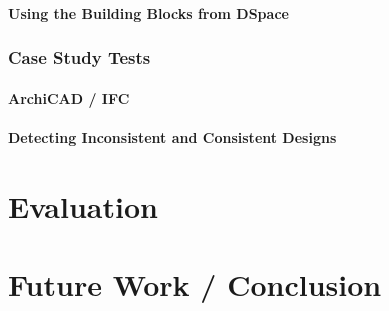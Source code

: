 \documentclass[12pt]{ucthesis}
\begin{document}
\subsubsection{Using the Building Blocks from DSpace}

\subsection{Case Study Tests}

\subsubsection{ArchiCAD / IFC}

\subsubsection{Detecting Inconsistent and Consistent Designs}

\chapter{Evaluation}


\chapter{Future Work / Conclusion}




\clearpage



\end{document}
